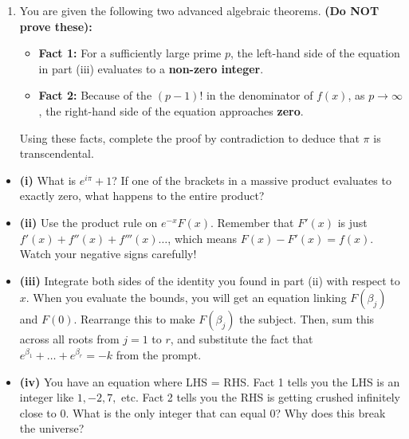 \begin{problem}
\begin{enumerate}
    \item[\textbf{(iv)}] You are given the following two advanced algebraic theorems. \textbf{(Do NOT prove these):}
    \begin{itemize}
        \item \textbf{Fact 1:} For a sufficiently large prime $p$, the left-hand side of the equation in part (iii) evaluates to a \textbf{non-zero integer}.
        \item \textbf{Fact 2:} Because of the $(p-1)!$ in the denominator of $f(x)$, as $p \to \infty$, the right-hand side of the equation approaches \textbf{zero}.
    \end{itemize}
    Using these facts, complete the proof by contradiction to deduce that $\pi$ is transcendental.
\end{enumerate}
\end{problem}

\begin{hint}
\begin{itemize}
    \item \textbf{(i)} What is $e^{i\pi} + 1$? If one of the brackets in a massive product evaluates to exactly zero, what happens to the entire product?
    \item \textbf{(ii)} Use the product rule on $e^{-x} F(x)$. Remember that $F'(x)$ is just $f'(x) + f''(x) + f'''(x) \dots$, which means $F(x) - F'(x) = f(x)$. Watch your negative signs carefully!
    \item \textbf{(iii)} Integrate both sides of the identity you found in part (ii) with respect to $x$. When you evaluate the bounds, you will get an equation linking $F(\beta_j)$ and $F(0)$. Rearrange this to make $F(\beta_j)$ the subject. Then, sum this across all roots from $j=1$ to $r$, and substitute the fact that $e^{\beta_1} + \dots + e^{\beta_r} = -k$ from the prompt.
    \item \textbf{(iv)} You have an equation where LHS = RHS. Fact 1 tells you the LHS is an integer like $1, -2, 7,$ etc. Fact 2 tells you the RHS is getting crushed infinitely close to $0$. What is the only integer that can equal $0$? Why does this break the universe?
\end{itemize}
\end{hint}

